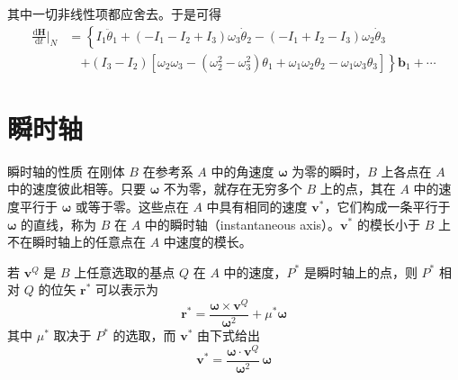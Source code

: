 \begin{example}
    其中一切非线性项都应舍去。于是可得
    \begin{equation}
        \begin{aligned}
            \frac{\mathrm{d}\mathbf{H}}{\mathrm{d}t}\Big|_{N}
            &= \left\{I_1\ddot{\theta}_1+(-I_1-I_2+I_3)\omega_3\dot{\theta}_2-(-I_1+I_2-I_3)\omega_2\dot{\theta}_3\right.\\
            &\quad\left.+(I_3-I_2)[\omega_2\omega_3-(\omega_2^2-\omega_3^2)\theta_1+\omega_1\omega_2\theta_2-\omega_1\omega_3\theta_3]\right\}\mathbf{b}_1+\cdots
        \end{aligned}
        \label{eq:缓慢小转动:H导数结果}
    \end{equation}
\end{example}

\section{瞬时轴}
\begin{myTheorem}{瞬时轴的性质}
在刚体 $B$ 在参考系 $A$ 中的角速度 $\bm{\omega}$ 为零的瞬时，$B$ 上各点在 $A$ 中的速度彼此相等。只要 $\bm{\omega}$ 不为零，就存在无穷多个 $B$ 上的点，其在 $A$ 中的速度平行于 $\bm{\omega}$ 或等于零。这些点在 $A$ 中具有相同的速度 $\mathbf{v}^*$，它们构成一条平行于 $\bm{\omega}$ 的直线，称为 $B$ 在 $A$ 中的瞬时轴（instantaneous axis）。$\mathbf{v}^*$ 的模长小于 $B$ 上不在瞬时轴上的任意点在 $A$ 中速度的模长。

若 $\mathbf{v}^Q$ 是 $B$ 上任意选取的基点 $Q$ 在 $A$ 中的速度，$P^*$ 是瞬时轴上的点，则 $P^*$ 相对 $Q$ 的位矢 $\mathbf{r}^*$ 可以表示为
\begin{equation}
    \mathbf{r}^* = \frac{\bm{\omega}\times\mathbf{v}^Q}{\bm{\omega}^2} + \mu^*\bm{\omega}
    \label{eq:瞬时轴:r星}
\end{equation}
其中 $\mu^*$ 取决于 $P^*$ 的选取，而 $\mathbf{v}^*$ 由下式给出
\begin{equation}
    \mathbf{v}^* = \frac{\bm{\omega}\cdot\mathbf{v}^Q}{\bm{\omega}^2}\,\bm{\omega}
    \label{eq:瞬时轴:v星}
\end{equation}
\end{myTheorem}

